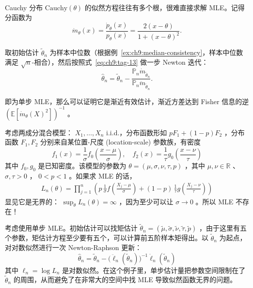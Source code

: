 \begin{example}
Cauchy 分布 $\mathrm{Cauchy}(\theta)$ 的似然方程往往有多个根，很难直接求解 MLE。记得分函数为
\[
\dot m_\theta(x)=\frac{\dot p_\theta(x)}{p_\theta(x)}= \frac{2(x-\theta)}{1+(x-\theta)^2}.
\]

取初始估计 $\widetilde{\theta}_n$ 为样本中位数（根据例~\ref{ex:ch9:median-consistency}，样本中位数满足 $\sqrt{n}$-相合），然后按照式~\eqref{eq:ch9:tag-13} 做一步 Newton 迭代：
\[
\widehat{\theta}_n = \widetilde{\theta}_n - \frac{\mathbb P_n\dot{m}_{\widetilde{\theta}_n}}{\mathbb P_n\ddot{m}_{\widetilde{\theta}_n}}.
\]

即为单步 MLE，那么可以证明它是渐近有效估计，渐近方差达到 Fisher 信息的逆 $(\mathbb{E}[\dot m_\theta(X)^2])^{-1}$ 。


\end{example}

\begin{example}[两成分混合模型]
考虑两成分混合模型： $X_1,\dots,X_n$ i.i.d.，分布函数形如 $pF_1+(1-p)F_2$ ，分布函数 $F_1,F_2$ 分别来自某位置-尺度 (location-scale) 参数族，有密度\[f_1(x)=\frac{1}{\sigma}f_0\left(\frac{x-\mu}\sigma\right),\quad f_2(x)=\frac{1}{\tau}g_0\left(\frac{x-\nu}\tau\right)\]
其中 $f_0,g_0$ 是已知密度。该模型的参数为 $\theta = (\mu,\sigma,\nu,\tau,p)$ ，其中 $\mu,\nu\in\mathbb R$ 、 $\sigma,\tau>0$ ， $0<p<1$ 。如果求 MLE 的话，\[\begin{aligned} L_n(\theta) = \prod_{j=1}^n \left( p\,\frac{1}{\sigma}f\!\left(\frac{X_j-\mu}{\sigma}\right) + (1-p)\,\frac{1}{\tau}g\!\left(\frac{X_j-\nu}{\tau}\right) \right) \end{aligned}\]
显见它是无界的： $\sup_\theta L_n(\theta)=\infty$ ，因为至少可以让 $\sigma\to 0$ 。所以 MLE 不存在！

考虑使用单步 MLE。初始估计可以找矩估计 $\widetilde{\theta}_n = (\widetilde{\mu},\widetilde{\sigma},\widetilde{\nu},\widetilde{\tau},\widetilde{p})$ ，由于这里有五个参数，矩估计方程至少要有五个，可以计算前五阶样本矩得出。以 $\widetilde{\theta}_n$ 为起点，对对数似然进行一次 Newton-Raphson 更新：\[\widehat{\theta}_n = \widetilde{\theta}_n - \bigl(\ddot{\ell}_n(\widetilde{\theta}_n)\bigr)^{-1} \dot{\ell}_n(\widetilde{\theta}_n)\]
其中 $\ell_n=\log L_n$ 是对数似然。在这个例子里，单步估计量把参数空间限制在了 $\widetilde\theta_n$ 的周围，从而避免了在非常大的空间中找 MLE 导致似然函数无界的问题。

\end{example}


